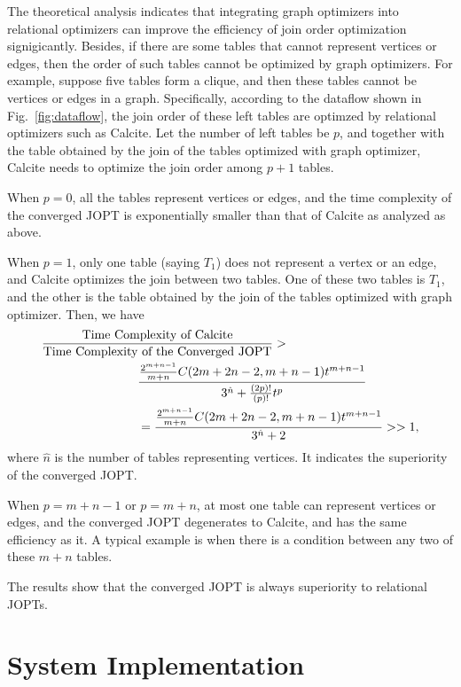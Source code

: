 \documentclass[sigconf, nonacm]{acmart}
\begin{document}
The theoretical analysis indicates that integrating graph optimizers into relational optimizers can improve the efficiency of join order optimization signigicantly.
Besides, if there are some tables that cannot represent vertices or edges, then the order of such tables cannot be optimized by graph optimizers.
For example, suppose five tables form a clique, and then these tables cannot be vertices or edges in a graph.
Specifically, according to the dataflow shown in Fig.~\ref{fig:dataflow}, the join order of these left tables are optimzed by relational optimizers such as Calcite.
Let the number of left tables be $p$, and together with the table obtained by the join of the tables optimized with graph optimizer, Calcite needs to optimize the join order among $p + 1$ tables.

When $p = 0$, all the tables represent vertices or edges, and the time complexity of the converged JOPT is exponentially smaller than that of Calcite as analyzed as above.

When $p = 1$, only one table (saying $T_1$) does not represent a vertex or an edge, and Calcite optimizes the join between two tables.
One of these two tables is $T_1$, and the other is the table obtained by the join of the tables optimized with graph optimizer.
Then, we have
\begin{equation*}
    \begin{split}
        \frac{\text{Time Complexity of Calcite}}{\text{Time Complexity of the Converged JOPT}} > \hspace{-12em} & \\
        & \frac{\frac{2^{m+n-1}}{m+n}C(2m+2n-2, m+n-1)t^{m + n - 1}}{3^{\hat{n}} + \frac{(2p)!}{(p)!}t^{p}} \\
        & = \frac{\frac{2^{m+n-1}}{m+n}C(2m+2n-2, m+n-1)t^{m + n - 1}}{3^{\hat{n}} + 2} >> 1,
    \end{split}
\end{equation*}
where $\hat{n}$ is the number of tables representing vertices.
It indicates the superiority of the converged JOPT.

When $p = m + n - 1$ or $p = m + n$, at most one table can represent vertices or edges, and the converged JOPT degenerates to Calcite, and has the same efficiency as it.
A typical example is when there is a condition between any two of these $m + n$ tables.

The results show that the converged JOPT is always superiority to relational JOPTs.


\section{System Implementation}
\label{sec:system-implementation}
\end{document}
